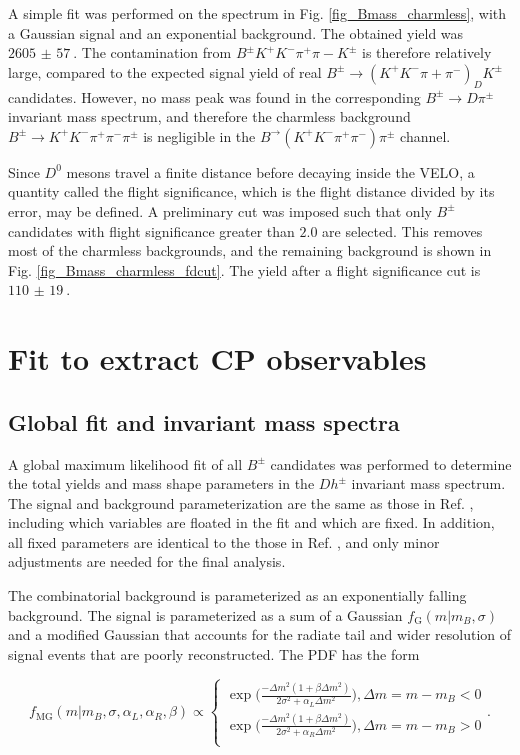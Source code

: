 \documentclass[12pt, a4paper, notitlepage, onecolumn]{article}
\numberwithin{equation}{section}
\begin{document}
A simple fit was performed on the spectrum in Fig. \ref{fig_Bmass_charmless}, with a Gaussian signal and an exponential background. The obtained yield was $\SI{2605(57)}{}$. The contamination from $B^\pm K^+K^-\pi^+\pi-K^\pm$ is therefore relatively large, compared to the expected signal yield of real $B^\pm\to (K^+K^-\pi+\pi^-)_DK^\pm$ candidates. However, no mass peak was found in the corresponding $B^\pm\to D\pi^\pm$ invariant mass spectrum, and therefore the charmless background $B^\pm\to K^+K^-\pi^+\pi^-\pi^\pm$ is negligible in the $B^\to (K^+K^-\pi^+\pi^-)\pi^\pm$ channel.

Since $D^0$ mesons travel a finite distance before decaying inside the VELO, a quantity called the flight significance, which is the flight distance divided by its error, may be defined. A preliminary cut was imposed such that only $B^\pm$ candidates with flight significance greater than $2.0$ are selected. This removes most of the charmless backgrounds, and the remaining background is shown in Fig. \ref{fig_Bmass_charmless_fdcut}. The yield after a flight significance cut is $\SI{110(19)}{}$.
\section{Fit to extract CP observables}
\subsection{Global fit and invariant mass spectra}
\label{section_global_fit}
\noindent A global maximum likelihood fit of all $B^\pm$ candidates was performed to determine the total yields and mass shape parameters in the $Dh^\pm$ invariant mass spectrum. The signal and background parameterization are the same as those in Ref. \cite{cite_LHCbGGSZKSpipi}, including which variables are floated in the fit and which are fixed. In addition, all fixed parameters are identical to the those in Ref. \cite{cite_LHCbGGSZKSpipi}, and only minor adjustments are needed for the final analysis.

The combinatorial background is parameterized as an exponentially falling background. The signal is parameterized as a sum of a Gaussian $f_\text{G}(m|m_B, \sigma)$ and a modified Gaussian that accounts for the radiate tail and wider resolution of signal events that are poorly reconstructed. The PDF has the form

\begin{equation}
  f_\text{MG}(m|m_B, \sigma, \alpha_L, \alpha_R, \beta)\propto
  \begin{cases}
    \exp\Big(\frac{-\Delta m^2(1 + \beta\Delta m^2)}{2\sigma^2 + \alpha_L\Delta m^2}\Big), \Delta m = m - m_B < 0 \\
    \exp\Big(\frac{-\Delta m^2(1 + \beta\Delta m^2)}{2\sigma^2 + \alpha_R\Delta m^2}\Big), \Delta m = m - m_B > 0 \\
  \end{cases}.
\end{equation}
\end{document}
